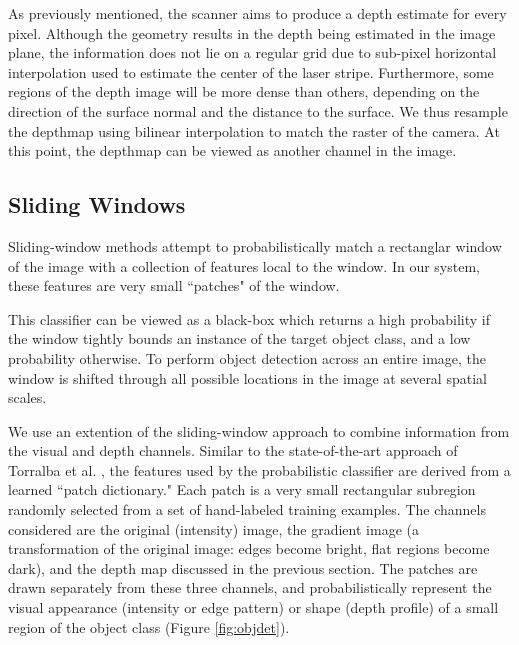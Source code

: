 \documentclass[letterpaper, 10 pt, conference]{ieeeconf}  %
\begin{document}
As previously mentioned, the scanner aims to produce a depth estimate for every
pixel. Although the geometry results in the depth being estimated in the image
plane, the information does not lie on a regular grid due to sub-pixel
horizontal interpolation used to estimate the center of the laser stripe.
Furthermore, some regions of the depth image will be more dense than others,
depending on the direction of the surface normal and the distance to the
surface. We thus resample the depthmap using bilinear interpolation to
match the raster of the camera. At this point, the depthmap can be
viewed as another channel in the image.

\subsection{Sliding Windows}

Sliding-window methods attempt to probabilistically match a rectanglar window of
the image with a collection of features local to the window. In our system,
these features are very small ``patches" of the window.

This classifier can be viewed as a black-box which returns a high probability
if the window tightly bounds an instance of the target object class, and a low
  probability otherwise. To perform object detection across an entire image,
  the window is shifted through all possible locations in the image at
  several spatial scales.

We use an extention of the sliding-window approach to combine information from
the visual and depth channels. Similar to the state-of-the-art approach of
Torralba et al. \cite{bib:torralba}, the features used by the probabilistic
classifier are derived from a learned ``patch dictionary." Each patch is a very
small rectangular subregion randomly selected from a set of hand-labeled
training examples. The channels considered are the original (intensity) image,
the gradient image (a transformation of the original image: edges become
bright, flat regions become dark), and the depth map discussed in the previous
section. The patches are drawn separately from these three channels, and 
probabilistically represent the visual appearance (intensity or
edge pattern) or shape (depth profile) of a small region of the object class (Figure \ref{fig:objdet}).
\end{document}
